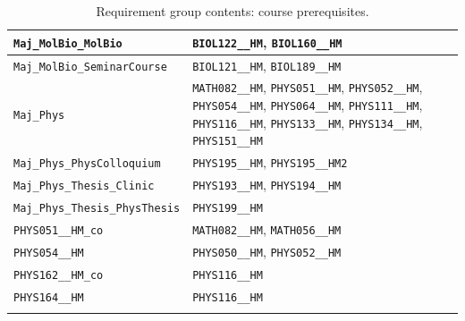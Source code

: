 \begin{longtable}{|p{4.4in}|p{4.4in}|}
    \verb|Maj_MolBio_MolBio| & \verb|BIOL122__HM|, \verb|BIOL160__HM|\\\hline
    \verb|Maj_MolBio_SeminarCourse| & \verb|BIOL121__HM|, \verb|BIOL189__HM|\\\hline
    \verb|Maj_Phys| & \verb|MATH082__HM|, \verb|PHYS051__HM|, \verb|PHYS052__HM|, \verb|PHYS054__HM|, \verb|PHYS064__HM|, \verb|PHYS111__HM|, \verb|PHYS116__HM|, \verb|PHYS133__HM|, \verb|PHYS134__HM|, \verb|PHYS151__HM|\\\hline
    \verb|Maj_Phys_PhysColloquium| & \verb|PHYS195__HM|, \verb|PHYS195__HM2|\\\hline
    \verb|Maj_Phys_Thesis_Clinic| & \verb|PHYS193__HM|, \verb|PHYS194__HM|\\\hline
    \verb|Maj_Phys_Thesis_PhysThesis| & \verb|PHYS199__HM|\\\hline
    \verb|PHYS051__HM_co| & \verb|MATH082__HM|, \verb|MATH056__HM|\\\hline
    \verb|PHYS054__HM| & \verb|PHYS050__HM|, \verb|PHYS052__HM|\\\hline
    \verb|PHYS162__HM_co| & \verb|PHYS116__HM|\\\hline
    \verb|PHYS164__HM| & \verb|PHYS116__HM|\\\hline
    \caption{Requirement group contents: course prerequisites.}
    \label{tab:reqs-coreqs}
\end{longtable}
